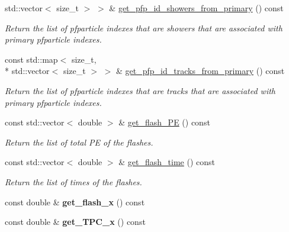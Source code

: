 \begin{DoxyCompactItemize}
std\-::vector$<$ size\-\_\-t $>$ $>$ \& \hyperlink{classlee_1_1ElectronEventSelectionAlg_a7ea645ce175506b368ceb116bbb77889}{get\-\_\-pfp\-\_\-id\-\_\-showers\-\_\-from\-\_\-primary} () const 
\begin{DoxyCompactList}\small\item\em Return the list of pfparticle indexes that are showers that are associated with primary pfparticle indexes. \end{DoxyCompactList}\item 
const std\-::map$<$ size\-\_\-t, \\*
std\-::vector$<$ size\-\_\-t $>$ $>$ \& \hyperlink{classlee_1_1ElectronEventSelectionAlg_a00266c70e046a9ee27e979be75925a09}{get\-\_\-pfp\-\_\-id\-\_\-tracks\-\_\-from\-\_\-primary} () const 
\begin{DoxyCompactList}\small\item\em Return the list of pfparticle indexes that are tracks that are associated with primary pfparticle indexes. \end{DoxyCompactList}\item 
const std\-::vector$<$ double $>$ \& \hyperlink{classlee_1_1ElectronEventSelectionAlg_a306e62904f73e727c6f938d2a197f68e}{get\-\_\-flash\-\_\-\-P\-E} () const 
\begin{DoxyCompactList}\small\item\em Return the list of total P\-E of the flashes. \end{DoxyCompactList}\item 
const std\-::vector$<$ double $>$ \& \hyperlink{classlee_1_1ElectronEventSelectionAlg_a9990f4a980662e786fc8e38146ce4456}{get\-\_\-flash\-\_\-time} () const 
\begin{DoxyCompactList}\small\item\em Return the list of times of the flashes. \end{DoxyCompactList}\item 
\hypertarget{classlee_1_1ElectronEventSelectionAlg_a69b697a2eec43de221621bd4aca906e2}{const double \& {\bfseries get\-\_\-flash\-\_\-x} () const }\label{classlee_1_1ElectronEventSelectionAlg_a69b697a2eec43de221621bd4aca906e2}

\item 
\hypertarget{classlee_1_1ElectronEventSelectionAlg_a2c653a5d3225c3e3aa5dc84738ffa086}{const double \& {\bfseries get\-\_\-\-T\-P\-C\-\_\-x} () const }\label{classlee_1_1ElectronEventSelectionAlg_a2c653a5d3225c3e3aa5dc84738ffa086}

\end{DoxyCompactItemize}
